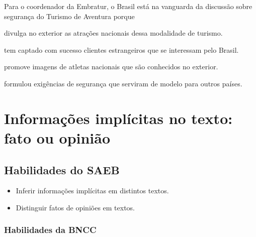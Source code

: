 {

Para o coordenador da Embratur, o Brasil está na vanguarda da discussão sobre 
segurança do Turismo de Aventura porque 

\begin{escolha}

  \item divulga no exterior as atrações nacionais dessa modalidade de turismo.

  \item tem captado com sucesso clientes estrangeiros que se interessam pelo Brasil.

  \item promove imagens de atletas nacionais que são conhecidos no exterior.

  \item formulou exigências de segurança que serviram de modelo para outros países.

\end{escolha}


\chapter{Informações implícitas no texto: fato ou opinião}

\section{Habilidades do SAEB}

\begin{itemize} 

  \item Inferir informações implícitas em distintos textos.

  \item Distinguir fatos de opiniões em textos.

\end{itemize}

\subsection{Habilidades da BNCC}

\begin{itemize} 


\end{itemize}}
